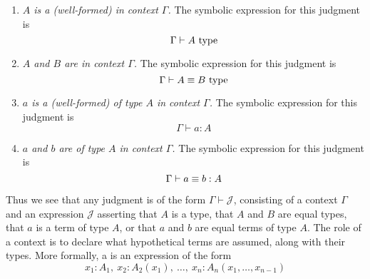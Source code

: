 \begin{enumerate}
\item \emph{$A$ is a (well-formed)  in context $\Gamma$.}
  The symbolic expression for this judgment is
  \begin{equation*}
    \Gamma\vdash A~\mathrm{type}
  \end{equation*}
\item \emph{$A$ and $B$ are  in context $\Gamma$.}
   The symbolic expression for this judgment is
  \begin{equation*}
    \Gamma\vdash A \equiv B~\mathrm{type}
  \end{equation*}
\item \emph{$a$ is a (well-formed)  of type $A$ in context $\Gamma$.} The symbolic expression for this judgment is
  \begin{equation*}
    \Gamma \vdash a:A
  \end{equation*}
\item \emph{$a$ and $b$ are  of type $A$ in context $\Gamma$.} The symbolic expression for this judgment is
  \begin{equation*}
    \Gamma\vdash a\equiv b:A
  \end{equation*}
\end{enumerate}
Thus we see that any judgment is of the form $\Gamma\vdash\mathcal{J}$, consisting of a context $\Gamma$ and an expression $\mathcal{J}$ asserting that $A$ is a type, that $A$ and $B$ are equal types, that $a$ is a term of type $A$, or that $a$ and $b$ are equal terms of type $A$. The role of a context is to declare what hypothetical terms are assumed, along with their types. More formally, a  is an expression of the form
\begin{equation}\label{eq:context}
x_1:A_1,~x_2:A_2(x_1),~\ldots,~x_n:A_n(x_1,\ldots,x_{n-1})
\end{equation}
